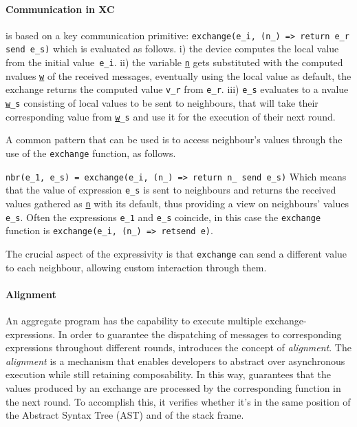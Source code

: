 \paragraph{Communication in XC}
\label{par:communication-in-xc}

\xc{} is based on a key communication primitive: \lstinline|exchange(e_i, (n_) => return e_r send e_s)| which is evaluated
as follows.
i) the device computes the local value from the initial value~\lstinline{e_i}.
ii) the variable \texttt{\underline{n}} gets substituted with the computed nvalues \texttt{\underline{w}} of the received messages, eventually
 using the local value as default, the exchange returns the computed value \lstinline{v_r} from \lstinline{e_r}.
iii) \lstinline{e_s} evaluates to a nvalue \texttt{\underline{w}\_s} consisting of local values to be sent to neighbours,
    that will take their corresponding value from \texttt{\underline{w}\_s} and use it for the execution of their next round.

A common pattern that can be used is to access neighbour's values through the use of the \texttt{exchange} function, as follows.

\lstinline|nbr(e_1, e_s) = exchange(e_i, (n_) => return n_ send e_s)|
Which means that the value of expression \lstinline{e_s} is sent to neighbours and returns the received values gathered as
\texttt{\underline{n}} with its default, thus providing a view on neighbours' values \lstinline{e_s}.
Often the expressions \lstinline{e_1} and \lstinline{e_s} coincide, in this case the \texttt{exchange} function is
\lstinline|exchange(e_i, (n_) => retsend e)|.

The crucial aspect of the \xc{} expressivity is that \texttt{exchange} can send a different value to each neighbour,
allowing custom interaction through them.

\paragraph{Alignment}
An aggregate program has the capability to execute multiple exchange-expressions.
In order to guarantee the dispatching of messages to corresponding expressions throughout different rounds,
    \xc{} introduces the concept of \emph{alignment}.
The \emph{alignment} is a mechanism that enables developers to abstract over asynchronous execution while still retaining
composability.
In this way, \xc{} guarantees that the values produced by an exchange are processed by the corresponding function
in the next round.
To accomplish this, it verifies whether it's in the same position of the Abstract Syntax Tree (AST) and of the stack frame.

